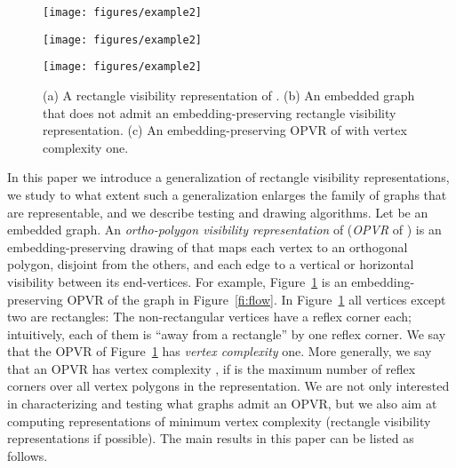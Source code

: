 \documentclass{article}
\newcommand{\opvr}{OPVR\xspace}
\begin{document}
\begin{figure}[tb]
    \centering
    \begin{minipage}[b]{.3\textwidth}
    	\centering
    	\texttt{[image: figures/example2]}
    	\subcaption{}\label{fi:rvr}
    \end{minipage}
    \hfil
    \begin{minipage}[b]{.3\textwidth}
    	\centering
    	\texttt{[image: figures/example2]}
    	\subcaption{}\label{fi:flow}
    \end{minipage}
    \hfil
    \begin{minipage}[b]{.3\textwidth}
    	\centering
    	\texttt{[image: figures/example2]}
    	\subcaption{}\label{fi:opvr}
    \end{minipage}
    \caption{(a) A rectangle visibility representation of . (b) An embedded graph  that does not admit an embedding-preserving rectangle visibility representation. (c) An embedding-preserving \opvr of  with vertex complexity one.}
\end{figure}

In this paper we introduce a generalization of rectangle visibility representations, we study to what extent such a generalization enlarges the family of graphs that are representable, and we describe testing and drawing algorithms. Let  be an embedded graph. An \emph{ortho-polygon visibility representation} of   (\emph{\opvr} of ) is an embedding-preserving drawing of  that maps each vertex to an orthogonal polygon, disjoint from the others, and each edge to a vertical or horizontal visibility between its end-vertices. For example, Figure~\ref{fi:opvr} is an embedding-preserving \opvr of the graph in Figure~\ref{fi:flow}.
In Figure~\ref{fi:opvr} all vertices except two are rectangles: The non-rectangular vertices have a reflex corner each; intuitively, each of them is ``away from a rectangle'' by one reflex corner. We say that the \opvr of Figure~\ref{fi:opvr} has \emph{vertex complexity} one. More  generally, we say that an \opvr has vertex complexity , if  is the maximum number of reflex corners over all vertex polygons in the representation.
We are not only interested in characterizing and testing what graphs admit an \opvr, but we also aim at computing representations of minimum vertex complexity (rectangle visibility representations if possible).
The main results in this paper can be listed as follows.
\end{document}
